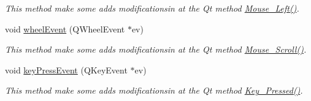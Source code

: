 \begin{DoxyCompactItemize}
\begin{DoxyCompactList}\small\item\em This method make some adds modificationsin at the Qt method \hyperlink{classQCustomLabel_ae5fe8fd62adb9568cfa6d412d6a62948}{Mouse\+\_\+\+Left()}. \end{DoxyCompactList}\item 
void \hyperlink{classQCustomLabel_ae7a4aaaf4f56d95199d1279923d7ff92}{wheel\+Event} (Q\+Wheel\+Event $\ast$ev)
\begin{DoxyCompactList}\small\item\em This method make some adds modificationsin at the Qt method \hyperlink{classQCustomLabel_aea283ddc963d921271109be3bcb82b6f}{Mouse\+\_\+\+Scroll()}. \end{DoxyCompactList}\item 
void \hyperlink{classQCustomLabel_a38e4ecf9b9298636b36594cdbace5260}{key\+Press\+Event} (Q\+Key\+Event $\ast$ev)\hypertarget{classQCustomLabel_a38e4ecf9b9298636b36594cdbace5260}{}\label{classQCustomLabel_a38e4ecf9b9298636b36594cdbace5260}

\begin{DoxyCompactList}\small\item\em This method make some adds modificationsin at the Qt method \hyperlink{classQCustomLabel_a8c48808fd1d4287bf220df16f7c2feb5}{Key\+\_\+\+Pressed()}. \end{DoxyCompactList}\end{DoxyCompactItemize}
